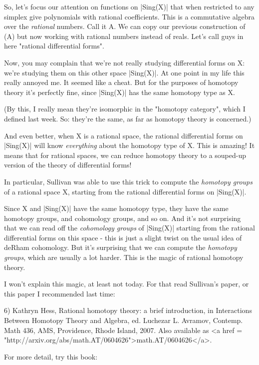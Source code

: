 So, let's focus our attention on functions on |Sing(X)| that when
restricted to any simplex give polynomials with rational coefficients.
This is a commutative algebra over the \emph{rational} numbers.  Call it A.
We can copy our previous construction of \Omega (A) but now working with 
rational numbers instead of reals.  Let's call guys in here "rational 
differential forms".

Now, you may complain that we're not really studying differential
forms on X: we're studying them on this other space |Sing(X)|.  At one
point in my life this really annoyed me.  It seemed like a cheat.  But
for the purposes of homotopy theory it's perfectly fine, since
|Sing(X)| has the same homotopy type as X.  

(By this, I really mean they're isomorphic in the "homotopy
category", which I defined last week.  So: they're the
same, as far as homotopy theory is concerned.)

And even better, when X is a rational space, the rational differential
forms on |Sing(X)| will know \emph{everything} about the homotopy type of
X.  This is amazing!  It means that for rational spaces, we can reduce
homotopy theory to a souped-up version of the theory of differential
forms!

In particular, Sullivan was able to use this trick to compute 
the \emph{homotopy groups} of a rational space X, starting from the
rational differential forms on |Sing(X)|.  

Since X and |Sing(X)| have the same homotopy type, they have the same
homotopy groups, and cohomology groups, and so on.  And it's not
surprising that we can read off the \emph{cohomology groups} of
|Sing(X)| starting from the rational differential forms on this space
- this is just a slight twist on the usual idea of deRham cohomology.
But it's surprising that we can compute the \emph{homotopy groups}, which
are usually a lot harder.  This is the magic of rational homotopy
theory.  

I won't explain this magic, at least not today.  For that read
Sullivan's paper, or this paper I recommended last time:

6) Kathryn Hess, Rational homotopy theory: a brief introduction,
in Interactions Between Homotopy Theory and Algebra, ed. 
Luchezar L. Avramov, Contemp. Math 436, AMS, Providence, Rhode
Island, 2007.   Also available as <a href = "http://arxiv.org/abs/math.AT/0604626">math.AT/0604626</a>.

For more detail, try this book:

